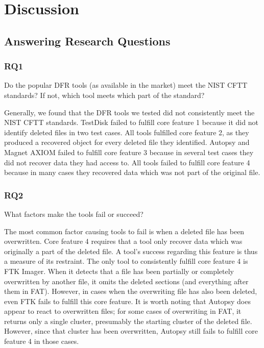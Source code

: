 \section{Discussion}

\subsection{Answering Research Questions}
\subsubsection{RQ1}
Do the popular DFR tools (as available in the market) meet the NIST CFTT standards? 
If not, which tool meets which part of the standard? 

Generally, we found that the DFR tools we tested did not consistently meet the NIST CFTT standards.
TestDisk failed to fulfill core feature 1 because it did not identify deleted files in two test cases.
All tools fulfilled core feature 2, as they produced a recovered object for every deleted file they identified.
Autopsy and Magnet AXIOM failed to fulfill core feature 3 because in several test cases they did not recover data they had access to.
All tools failed to fulfill core feature 4 because in many cases they recovered data which was not part of the original file.

\subsubsection{RQ2}
What factors make the tools fail or succeed?

The most common factor causing tools to fail is when a deleted file has been overwritten.
Core feature 4 requires that a tool only recover data which was originally a part of the deleted file.
A tool's success regarding this feature is thus a measure of its restraint.
The only tool to consistently fulfill core feature 4 is FTK Imager.
When it detects that a file has been partially or completely overwritten by another file, it omits the deleted sections (and everything after them in FAT).
However, in cases when the overwriting file has also been deleted, even FTK fails to fulfill this core feature.
It is worth noting that Autopsy does appear to react to overwritten files; for some cases of overwriting in FAT, it returns only a single cluster, presumably the starting cluster of the deleted file.
However, since that cluster has been overwritten, Autopsy still fails to fulfill core feature 4 in those cases.

